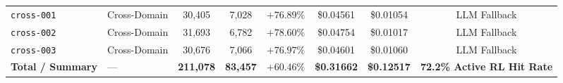 \begin{table}[!t]
\begin{tabular}{llcccccc}
\texttt{cross-001} & Cross-Domain & 30,405 & 7,028 & $+76.89\%$ & \$0.04561 & \$0.01054 & LLM Fallback \\
\texttt{cross-002} & Cross-Domain & 31,693 & 6,782 & $+78.60\%$ & \$0.04754 & \$0.01017 & LLM Fallback \\
\texttt{cross-003} & Cross-Domain & 30,676 & 7,066 & $+76.97\%$ & \$0.04601 & \$0.01060 & LLM Fallback \\
\midrule
\textbf{Total / Summary} & --- & \textbf{211,078} & \textbf{83,457} & $\mathbf{+60.46\%}$ & \textbf{\$0.31662} & \textbf{\$0.12517} & \textbf{72.2\% Active RL Hit Rate} \\
\bottomrule
\end{tabular}
\end{table}
